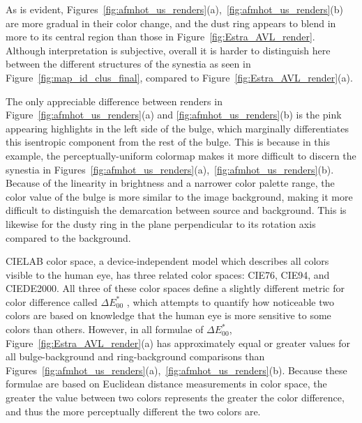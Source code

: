 \documentclass[fleqn,usenatbib,useAMS]{mnras}
\begin{document}
As is evident, Figures~\ref{fig:afmhot_us_renders}(a),~\ref{fig:afmhot_us_renders}(b) are more gradual in their color change, and the dust ring appears to blend in more to its central region than those in Figure~\ref{fig:Estra_AVL_render}. Although interpretation is subjective, overall it is harder to distinguish here between the different structures of the synestia as seen in Figure~\ref{fig:map_id_clus_final}, compared to Figure~\ref{fig:Estra_AVL_render}(a). \par

The only appreciable difference between renders in Figure~\ref{fig:afmhot_us_renders}(a) and \ref{fig:afmhot_us_renders}(b) is the pink appearing highlights in the left side of the bulge, which marginally differentiates this isentropic component from the rest of the bulge. This is because in this example, the perceptually-uniform colormap makes it more difficult to discern the synestia in Figures~\ref{fig:afmhot_us_renders}(a),~\ref{fig:afmhot_us_renders}(b). Because of the linearity in brightness and a narrower color palette range, the color value of the bulge is more similar to the image background, making it more difficult to distinguish the demarcation between source and background. This is likewise for the dusty ring in the plane perpendicular to its rotation axis compared to the background. \par

CIELAB color space, a device-independent model which describes all colors visible to the human eye, has three related color spaces: CIE76, CIE94, and CIEDE2000. All three of these color spaces define a slightly different metric for color difference called $\Delta E^*_{00}$ \citep{Luo01}, which attempts to quantify how noticeable two colors are based on knowledge that the human eye is more sensitive to some colors than others. However, in all formulae of $\Delta E^*_{00}$, Figure~\ref{fig:Estra_AVL_render}(a) has approximately equal or greater values for all bulge-background and ring-background comparisons than Figures~\ref{fig:afmhot_us_renders}(a),~\ref{fig:afmhot_us_renders}(b). Because these formulae are based on Euclidean distance measurements in color space, the greater the value between two colors represents the greater the color difference, and thus the more perceptually different the two colors are. \par
\end{document}

